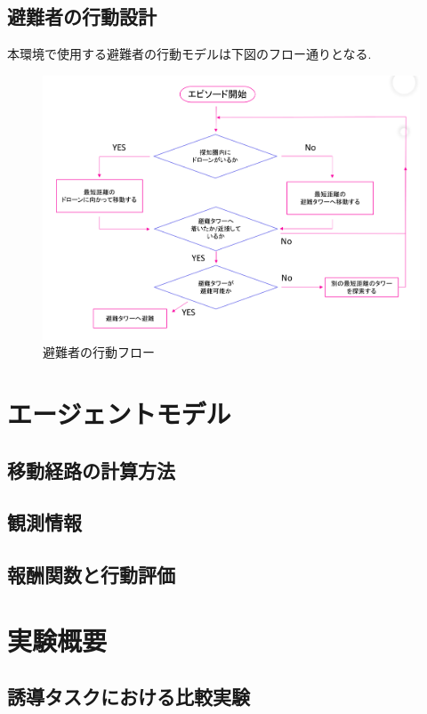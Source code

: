 \subsection{避難者の行動設計}
本環境で使用する避難者の行動モデルは下図のフロー通りとなる.
\begin{figure}[H] 
  \centering 
  \includegraphics[width=1.0\textwidth]{Figures/334170449-c22ed682-06c1-4fbc-ba4b-07d946d8a047.png}
  \caption{避難者の行動フロー} 
  \label{fig:01} 
\end{figure}


\section{エージェントモデル}
  \subsection{移動経路の計算方法}
  \subsection{観測情報}
  \subsection{報酬関数と行動評価}


\section{実験概要}
  \subsection{誘導タスクにおける比較実験}
